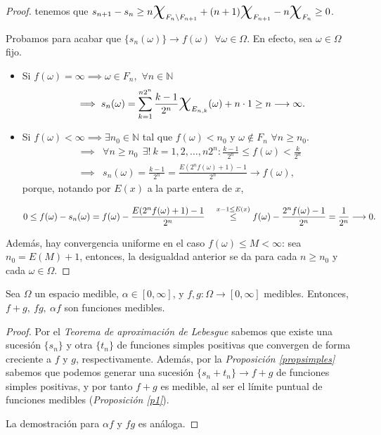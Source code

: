 \begin{proof}
tenemos que $\displaystyle s_{n+1}-s_n \geq  n \text{\huge{$\chi$}}_{F_{n}\setminus F_{n+1}}+ (n+1) \text{\huge{$\chi$}}_{F_{n+1}} - n \text{\huge{$\chi$}}_{F_n} \geq 0$.


Probamos para acabar que $\{ s_n(\omega)\} \to f(\omega) \ \ \forall \omega\in\Omega$. En efecto, sea $\omega\in\Omega$ fijo.
 \begin{itemize}
 \item Si $f(\omega)=\infty \implies \omega\in F_n, $ $\forall n\in \mathbb N$
 \[
 \implies s_n(\omega) =\sum_{k=1}^{n2^n} \frac{k-1}{2^n} \text{\huge{$\chi$}}_{E_{n,k}}(\omega) + n \cdot1\geq n\longrightarrow \infty .
 \]
 \item Si $f(\omega)<\infty \implies \exists n_0\in\mathbb N$ tal que $f(\omega)< n_0$ y $\omega\not\in F_n$ $\forall n\geq n_0$.
 \[
 \begin{aligned}
\implies& \forall n\geq n_0 \ \ \exists ! \ k= 1,2,\dots,n2^n : \frac{k-1}{2^n} \leq f(\omega) < \frac{k}{2^n}
\\
 \implies& s_n(\omega) = \frac{k-1}{2^n} = \frac{E(2^n f(\omega)+1)-1}{2^n} \longrightarrow f(\omega),
 \end{aligned}
  \]
  porque, notando por $E(x)$ a la parte entera de $x$, 

  \[
	  \displaystyle 0\leq f(\omega) - s_n(\omega) = f(\omega) - \frac{E(2^n f(\omega)+1)-1}{2^n} \quad \stackrel{x-1 \le E( x ) }{\le} \\ f(\omega) - \frac{2^n f(\omega)-1}{2^n}  = \frac{1}{2^n}\longrightarrow 0
  .\]
 \end{itemize}
\vspace{0.5em}
Además, hay convergencia uniforme en el caso $f(\omega) \le M <\infty$: sea $n_0 = E\left( M \right) +1$, entonces, la desigualdad anterior se da para
cada $n \ge n_0$ y cada $\omega\in\Omega$.
\end{proof}

\begin{ncor} \label{arit_medibles} Sea $\Omega$ un espacio medible, \mbox{$\alpha \in [0,\infty]$}, y $f,g : \Omega \to [0,\infty]$ medibles. Entonces, $f + g, \ fg, \ \alpha f$ son funciones medibles.
\end{ncor}

  \begin{proof}
    Por el \textit{Teorema de aproximación de Lebesgue} sabemos que existe una sucesión $\{s_n\}$ y otra $\{t_n\}$ de funciones simples positivas que convergen de forma creciente a $f$ y $g$, respectivamente. Además, por la \textit{Proposición \ref{propsimples}} sabemos que podemos generar una sucesión $\{s_n+t_n\} \to f+g$ de funciones simples positivas, y por tanto $f+g$ es medible, al ser el límite puntual de funciones medibles (\textit{Proposición \ref{p1}}).

    La demostración para $ \alpha f$ y $fg$ es análoga.
  \end{proof}


